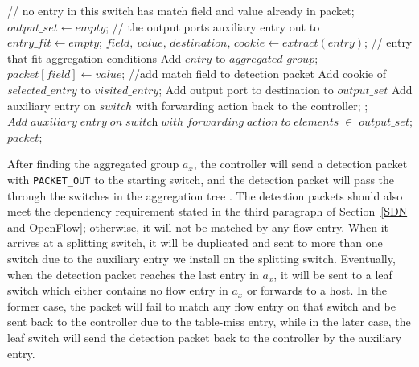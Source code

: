 \begin {tcolorbox}[blanker,float=tbp,
grow to left by=1cm, grow to right by=1cm]
\begin{algorithm}[H]
  \begin{algorithmic}[1]
      \State // no entry in this switch has match field and value already in packet;
      \State $\textit{output\_set} \gets empty$;  //  the output ports auxiliary entry out to
      \State $\textit{entry\_fit} \gets empty$; 
        \State $\textit{field, value, destination, cookie} \gets extract(\textit{entry})$;
          //  entry that fit aggregation conditions
          \State Add $entry$ to $aggregated\_group$;
          \State $\textit{packet}[\textit{field}] \gets \textit{value}$;  //add match field to detection packet
          \State Add cookie of $selected\_entry$ to $visited\_entry$;
          \State Add output port to destination to $output\_set$
            \State Add auxiliary entry on $switch$ with forwarding action back to the controller;
          \EndIf
          \State {}; 
        \EndIf
      \EndFor
        \State $Add\;auxiliary\;entry\;on\;\textit{switch}\;with\;forwarding\;action\;to\;elements\;\in\;
        \textit{output\_set}$;
      \EndIf
      \State \Return $packet$;
    \EndFunction
\end{algorithmic}
\end{algorithm}
\end{tcolorbox}

After finding the aggregated group $a_x$, the controller will send a detection packet with \texttt{PACKET\_OUT} to the starting switch, and the detection packet will pass the through the switches in the aggregation tree \sout{}. The detection packets should also meet the dependency requirement stated in the third paragraph of Section~\ref{SDN and OpenFlow}; otherwise, it will not be matched by any flow entry. When it arrives at a splitting switch, it will be duplicated and sent to more than one switch due to the auxiliary entry we install on the splitting switch. Eventually, when the detection packet reaches the last entry in $a_x$, it will be sent to a leaf switch which either contains no flow entry in $a_x$ or forwards to a host. In the former case, the packet will fail to match any flow entry on that switch and be sent back to the controller due to the table-miss entry, while in the later case, the leaf switch will send the detection packet back to the controller by the auxiliary entry. 

